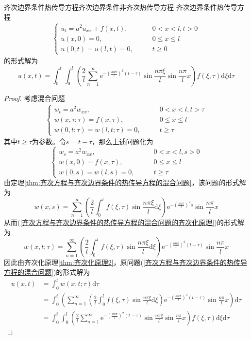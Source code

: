 \documentclass[lang = cn, scheme = chinese, thmcnt = section]{elegantbook}
\newcommand{\dd}{\mathrm{d}}           %
\begin{document}
\begin{theorem}{齐次边界条件热传导方程}{齐次边界条件非齐次热传导方程}
	齐次边界条件热传导方程
	\begin{align*}\label{齐次方程与齐次边界条件的热传导方程的混合问题}
		\begin{cases}
			u_t=a^2u_{xx}+f(x,t),\qquad & 0<x<l,t>0\\
			u(x,0)=0,\qquad & 0\le x \le l\\
			u(0,t)=u(l,t)=0,\qquad & t\ge 0
		\end{cases}\tag{*}
	\end{align*}
	的形式解为
	$$
	u(x,t)
	= \int_{0}^{t}\int_{0}^{l}
	\left(\frac{2}{l}\sum_{n=1}^{\infty}\mathrm{e}^{-\left(\frac{an\pi}{l}\right)^2(t-\tau)}\sin\frac{n\pi\xi}{l}\sin\frac{n\pi}{l}x\right)
	f(\xi,\tau)\dd \xi\dd \tau
	$$
\end{theorem}

\begin{proof}
	考虑混合问题
	\begin{align*}\label{齐次方程与齐次边界条件的热传导方程的混合问题的齐次化原理}
		\begin{cases}
			w_t=a^2w_{xx},\qquad & 0<x <l,t>\tau\\
			w(x,\tau;\tau)=f(x,\tau),\qquad & 0\le x \le l\\
			w(0,t;\tau)=w(l,t;\tau)=0,\qquad & t\ge \tau
		\end{cases}\tag{**}
	\end{align*}
	其中$t\ge\tau$为参数。令$ s=t-\tau $，那么上述问题化为
	$$
	\begin{cases}
		w_s=a^2w_{xx},\qquad & 0<x <l,s>0\\
		w(x,0)=f(x,\tau),\qquad & 0\le x \le l\\
		w(0,s)=w(l,s)=0,\qquad & t\ge \tau
	\end{cases}
	$$
	由定理\ref{thm:齐次方程与齐次边界条件的热传导方程的混合问题}，该问题的形式解为
	$$
	w(x,s)=\sum_{n=1}^{\infty}\left(\frac{2}{l}\int_{0}^{l}f(\xi,\tau)\sin\frac{n\pi\xi}{l}\dd \xi\right)\mathrm{e}^{-\left(\frac{an\pi}{l}\right)^2s}\sin\frac{n\pi}{l}x
	$$
	从而(\ref{齐次方程与齐次边界条件的热传导方程的混合问题的齐次化原理})的形式解为
	$$
	w(x,t;\tau)=\sum_{n=1}^{\infty}\left(\frac{2}{l}\int_{0}^{l}f(\xi,\tau)\sin\frac{n\pi\xi}{l}\dd \xi\right)\mathrm{e}^{-\left(\frac{an\pi}{l}\right)^2(t-\tau)}\sin\frac{n\pi}{l}x
	$$
	因此由齐次化原理\ref{thm:齐次化原理2}，原问题(\ref{齐次方程与齐次边界条件的热传导方程的混合问题})的形式解为
	\begin{align*}
		u(x,t)
		& = 
		\int_{0}^{t}w(x,t;\tau)\dd \tau\\
		& = \int_{0}^{t}\left(\sum_{n=1}^{\infty}\left(\frac{2}{l}\int_{0}^{l}f(\xi,\tau)\sin\frac{n\pi\xi}{l}\dd \xi\right)\mathrm{e}^{-\left(\frac{an\pi}{l}\right)^2(t-\tau)}\sin\frac{n\pi}{l}x\right)\dd \tau\\
		& = \int_{0}^{t}\int_{0}^{l}
		\left(\frac{2}{l}\sum_{n=1}^{\infty}\mathrm{e}^{-\left(\frac{an\pi}{l}\right)^2(t-\tau)}\sin\frac{n\pi\xi}{l}\sin\frac{n\pi}{l}x\right)
		f(\xi,\tau)\dd \xi\dd \tau
	\end{align*}
\end{proof}
\end{document}
